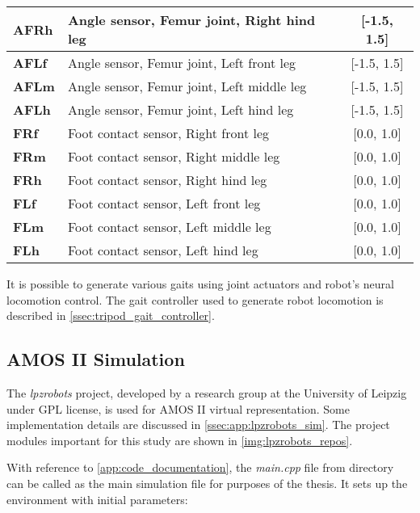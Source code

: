 \begin{table}[H]
\begin{tabular}{|l|l|c|}
\textbf{AFRh}         & Angle sensor, Femur joint, Right hind leg        & {[}-1.5, 1.5{]}         \\ \hline
\textbf{AFLf}         & Angle sensor, Femur joint, Left front leg        & {[}-1.5, 1.5{]}         \\ \hline
\textbf{AFLm}         & Angle sensor, Femur joint, Left middle leg       & {[}-1.5, 1.5{]}         \\ \hline
\textbf{AFLh}         & Angle sensor, Femur joint, Left hind leg         & {[}-1.5, 1.5{]}         \\ \hline
\textbf{FRf}          & Foot contact sensor, Right front leg             & {[}0.0, 1.0{]}          \\ \hline
\textbf{FRm}          & Foot contact sensor, Right middle leg            & {[}0.0, 1.0{]}          \\ \hline
\textbf{FRh}          & Foot contact sensor, Right hind leg              & {[}0.0, 1.0{]}          \\ \hline
\textbf{FLf}          & Foot contact sensor, Left front leg              & {[}0.0, 1.0{]}          \\ \hline
\textbf{FLm}          & Foot contact sensor, Left middle leg             & {[}0.0, 1.0{]}          \\ \hline
\textbf{FLh}          & Foot contact sensor, Left hind leg               & {[}0.0, 1.0{]}          \\ \hline
\end{tabular}
\end{table}

It is possible to generate various gaits using joint actuators and robot's neural locomotion control. The gait controller used to generate robot locomotion is described in \cref{ssec:tripod_gait_controller}.

\subsection{AMOS II Simulation} \label{ssec:amosii_sim}
The \textit{lpzrobots} project, developed by a research group at the University of Leipzig \citep{misc:lpzrobots} under GPL license, is used for AMOS II virtual representation. Some implementation details are discussed in \cref{ssec:app:lpzrobots_sim}. The project modules important for this study are shown in \cref{img:lpzrobots_repos}.

With reference to \cref{app:code_documentation}, the \textit{main.cpp} file from  directory can be called as the main simulation file for purposes of the thesis. It sets up the environment with initial parameters:

